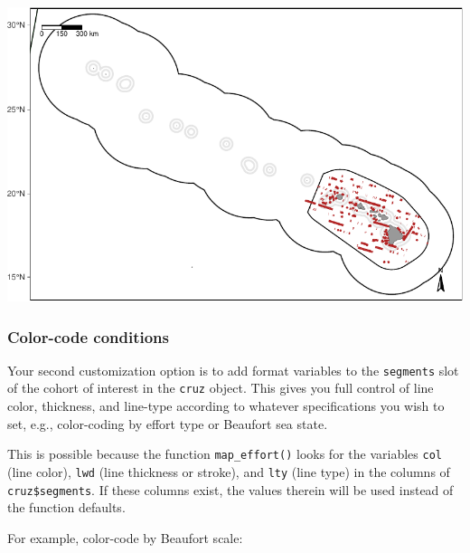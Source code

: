 \documentclass[
]{book}
\begin{document}
\includegraphics{figures/unnamed-chunk-59-1.pdf}

\hypertarget{color-code-conditions}{%
\subsubsection*{Color-code conditions}\label{color-code-conditions}}

Your second customization option is to add format variables to the \texttt{segments} slot of the cohort of interest in the \texttt{cruz} object. This gives you full control of line color, thickness, and line-type according to whatever specifications you wish to set, e.g., color-coding by effort type or Beaufort sea state.

This is possible because the function \texttt{map\_effort()} looks for the variables \texttt{col} (line color), \texttt{lwd} (line thickness or stroke), and \texttt{lty} (line type) in the columns of \texttt{cruz\$segments}. If these columns exist, the values therein will be used instead of the function defaults.

For example, color-code by Beaufort scale:
\end{document}
